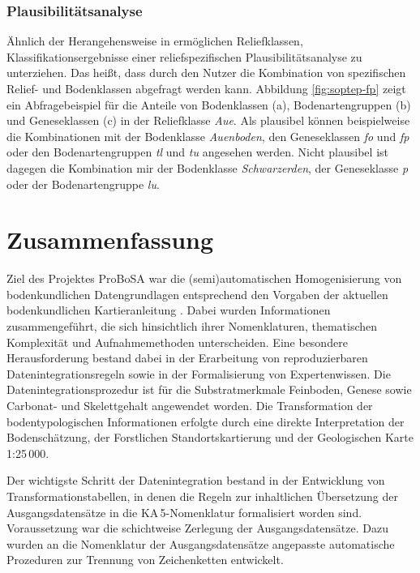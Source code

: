 \subsubsection{Plausibilitätsanalyse}\label{sec:ext-ps}
Ähnlich der Herangehensweise in \citet{Moeller-etal2012catena} ermöglichen Reliefklassen, Klassifikationsergebnisse einer reliefspezifischen Plausibilitätsanalyse zu unterziehen. Das heißt, dass durch den Nutzer die Kombination von spezifischen Relief- und Bodenklassen abgefragt werden kann. Abbildung \ref{fig:soptep-fp} zeigt ein Abfragebeispiel für die Anteile von Bodenklassen (a), Bodenartengruppen (b) und Geneseklassen (c) in der Reliefklasse \textit{Aue}. Als plausibel können beispielweise die Kombinationen mit der Bodenklasse \textit{Auenboden}, den Geneseklassen \textit{fo} und \textit{fp} oder den Bodenartengruppen \textit{tl} und \textit{tu} angesehen werden. Nicht plausibel ist dagegen die Kombination mir der Bodenklasse \textit{Schwarzerden}, der Geneseklasse \textit{p} oder der Bodenartengruppe \textit{lu}.




\section{Zusammenfassung}\label{sec:fazit}
Ziel des Projektes ProBoSA war die (semi)automatischen Homogenisierung von bodenkundlichen Datengrundlagen entsprechend den Vorgaben der aktuellen bodenkundlichen Kartieranleitung \citep{KA5}. Dabei wurden Informationen zusammengeführt, die sich hinsichtlich ihrer Nomenklaturen, thematischen Komplexität und  Aufnahmemethoden unterscheiden. Eine besondere Herausforderung bestand dabei in der Erarbeitung von reproduzierbaren Datenintegrationsregeln sowie in der Formalisierung von Expertenwissen. Die Datenintegrationsprozedur ist für die Substratmerkmale Feinboden, Genese sowie Carbonat- und Skelettgehalt angewendet worden. Die Transformation der bodentypologischen Informationen erfolgte durch eine direkte Interpretation der Bodenschätzung, der  Forstlichen Standortskartierung und der Geologischen Karte 1:25\,000.\ 

Der wichtigste Schritt der Datenintegration bestand in der Entwicklung von Transformationstabellen, in denen die Regeln zur inhaltlichen Übersetzung  der Ausgangsdatensätze in die KA\,5-Nomenklatur formalisiert worden sind. Voraussetzung war die schichtweise Zerlegung der Ausgangsdatensätze. Dazu wurden an die Nomenklatur der Ausgangsdatensätze angepasste automatische Prozeduren zur Trennung von Zeichenketten entwickelt.\ 

